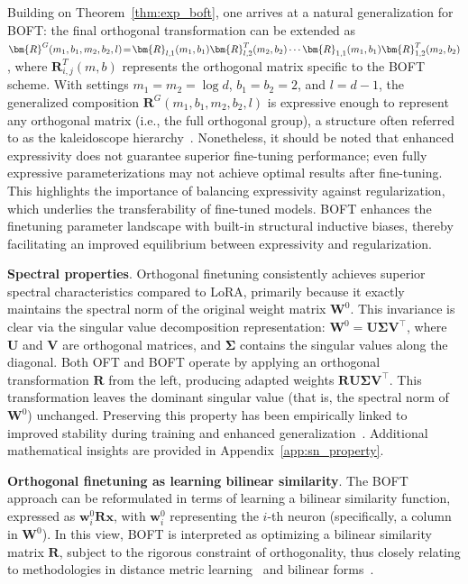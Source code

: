 Building on Theorem~\ref{thm:exp_boft}, one arrives at a natural generalization for BOFT: the final orthogonal transformation can be extended as $\thickmuskip=2mu \medmuskip=2mu \bm{R}^G(m_1,b_1,m_2,b_2,l)=\bm{R}_{l,1}(m_1,b_1)\bm{R}_{l,2}^T(m_2,b_2)\cdots\bm{R}_{1,1}(m_1,b_1)\bm{R}_{1,2}^T(m_2,b_2)$, where $\bm{R}_{i,j}^T(m,b)$ represents the orthogonal matrix specific to the BOFT scheme. With settings $m_1=m_2=\log d$, $b_1=b_2=2$, and $l=d-1$, the generalized composition $\bm{R}^G(m_1,b_1,m_2,b_2,l)$ is expressive enough to represent any orthogonal matrix (i.e., the full orthogonal group), a structure often referred to as the kaleidoscope hierarchy~\cite{dao2019kaleidoscope}. Nonetheless, it should be noted that enhanced expressivity does not guarantee superior fine-tuning performance; even fully expressive parameterizations may not achieve optimal results after fine-tuning. This highlights the importance of balancing expressivity against regularization, which underlies the transferability of fine-tuned models. BOFT enhances the finetuning parameter landscape with built-in structural inductive biases, thereby facilitating an improved equilibrium between expressivity and regularization.

\textbf{Spectral properties}. Orthogonal finetuning consistently achieves superior spectral characteristics compared to LoRA, primarily because it exactly maintains the spectral norm of the original weight matrix $\bm{W}^0$. This invariance is clear via the singular value decomposition representation: $\bm{W}^0=\bm{U}\bm{\Sigma}\bm{V}^\top$, where $\bm{U}$ and $\bm{V}$ are orthogonal matrices, and $\bm{\Sigma}$ contains the singular values along the diagonal. Both OFT and BOFT operate by applying an orthogonal transformation $\bm{R}$ from the left, producing adapted weights $\bm{R}\bm{U}\bm{\Sigma}\bm{V}^\top$. This transformation leaves the dominant singular value (that is, the spectral norm of $\bm{W}^0$) unchanged. Preserving this property has been empirically linked to improved stability during training and enhanced generalization~\cite{miyato2018spectral,yoshida2017spectral}. Additional mathematical insights are provided in Appendix~\ref{app:sn_property}.

\textbf{Orthogonal finetuning as learning bilinear similarity}. The BOFT approach can be reformulated in terms of learning a bilinear similarity function, expressed as $\bm{w}^0_i\bm{R}\bm{x}$, with $\bm{w}^0_i$ representing the $i$-th neuron (specifically, a column in $\bm{W}^0$). In this view, BOFT is interpreted as optimizing a bilinear similarity matrix $\bm{R}$, subject to the rigorous constraint of orthogonality, thus closely relating to methodologies in distance metric learning~\cite{xing2002distance} and bilinear forms~\cite{roman2005advanced}.


